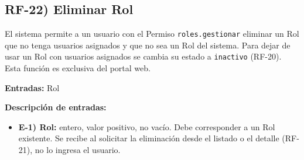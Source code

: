 \subsection*{RF-22) Eliminar Rol}
El sistema permite a un usuario con el Permiso \texttt{roles.gestionar} eliminar un Rol que no tenga usuarios asignados y que no sea un Rol del sistema. Para dejar de usar un Rol con usuarios asignados se cambia su estado a \texttt{inactivo} (RF-20). Esta funci\'on es exclusiva del portal web.

\textbf{Entradas:} Rol

\textbf{Descripci\'on de entradas:}
\begin{itemize}[label={}, leftmargin=1.5em]
  \item \textbf{E-1) Rol:} entero, valor positivo, no vac\'io. Debe corresponder a un Rol existente. Se recibe al solicitar la eliminaci\'on desde el listado o el detalle (RF-21), no lo ingresa el usuario.
\end{itemize}

